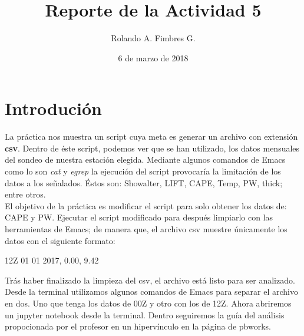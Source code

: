 \documentclass{article}
\title{Reporte de la Actividad 5}
\author{Rolando A. Fimbres G.}
\date{6 de marzo de 2018}
\begin{document}
\maketitle
\section{Introdución}
La práctica nos muestra un script cuya meta es generar un archivo con extensión \textbf{csv}. Dentro de éste script, podemos ver que se han utilizado, los datos mensuales del sondeo de nuestra estación elegida. Mediante algunos comandos de Emacs como lo son \textit{cat} y \textit{egrep} la ejecución del script provocaría la limitación de los datos a los señalados. Éstos son: Showalter, LIFT, CAPE, Temp, PW, thick; entre otros.\\
El objetivo de la práctica es modificar el script para solo obtener los datos de: CAPE y PW. Ejecutar el script modificado para después limpiarlo con las herramientas de Emacs; de manera que, el archivo csv muestre únicamente los datos con el siguiente formato:\\
\begin{center}
12Z  01  01  2017,  0.00,  9.42\\
\end{center}
Trás haber finalizado la limpieza del csv, el archivo está listo para ser analizado. Desde la terminal utilizamos algunos comandos de Emacs para separar el archivo en dos. Uno que tenga los datos de 00Z y otro con los de 12Z. Ahora abriremos un jupyter notebook desde la terminal. Dentro seguiremos la guía del análisis propocionada por el profesor en un hipervínculo en la página de pbworks.\\
\end{document}

